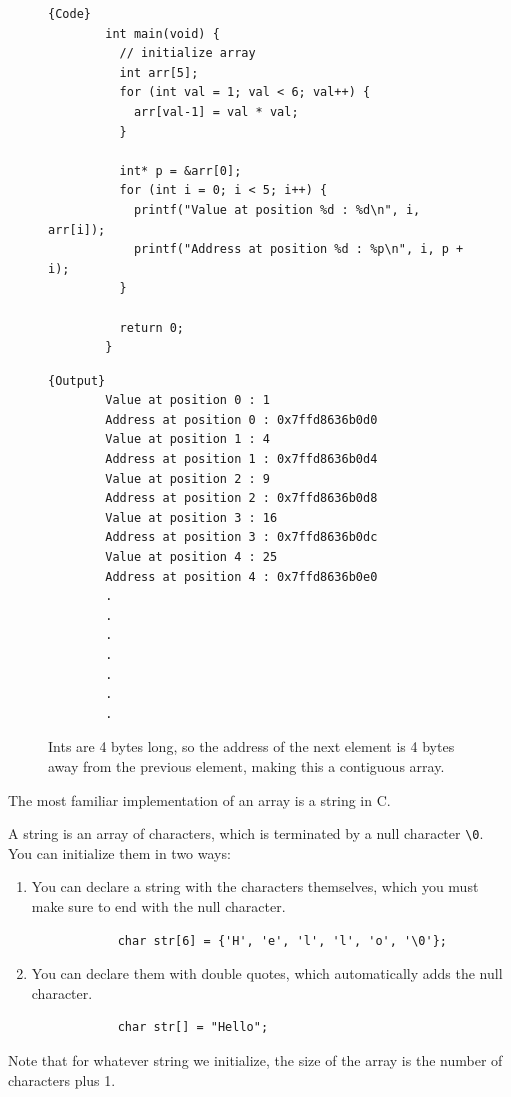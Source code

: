 \documentclass{article}
\newcounter{definition}[section]
\begin{document}
    \begin{figure}[H]
      \centering 
      \noindent\begin{minipage}{.5\textwidth}
      \begin{lstlisting}[]{Code}
        int main(void) {
          // initialize array 
          int arr[5]; 
          for (int val = 1; val < 6; val++) {
            arr[val-1] = val * val;
          }

          int* p = &arr[0]; 
          for (int i = 0; i < 5; i++) {
            printf("Value at position %d : %d\n", i, arr[i]); 
            printf("Address at position %d : %p\n", i, p + i); 
          }

          return 0; 
        }        
      \end{lstlisting}
      \end{minipage}
      \hfill
      \begin{minipage}{.49\textwidth}
      \begin{lstlisting}[]{Output}
        Value at position 0 : 1
        Address at position 0 : 0x7ffd8636b0d0
        Value at position 1 : 4
        Address at position 1 : 0x7ffd8636b0d4
        Value at position 2 : 9
        Address at position 2 : 0x7ffd8636b0d8
        Value at position 3 : 16
        Address at position 3 : 0x7ffd8636b0dc
        Value at position 4 : 25
        Address at position 4 : 0x7ffd8636b0e0
        .
        .
        .
        .
        .
        .
        .
      \end{lstlisting}
      \end{minipage}
      \caption{Ints are 4 bytes long, so the address of the next element is 4 bytes away from the previous element, making this a contiguous array.} 
      \label{fig:contiguous_array}
    \end{figure}

    The most familiar implementation of an array is a string in C. 

    \begin{definition}[String]
      \label{def:string}
      A string is an array of characters, which is terminated by a null character \texttt{\textbackslash 0}. You can initialize them in two ways: 
      \begin{enumerate}
        \item You can declare a string with the characters themselves, which you must make sure to end with the null character. 
          \begin{lstlisting} 
            char str[6] = {'H', 'e', 'l', 'l', 'o', '\0'}; 
          \end{lstlisting}
        \item You can declare them with double quotes, which automatically adds the null character. 
          \begin{lstlisting} 
            char str[] = "Hello"; 
          \end{lstlisting}
      \end{enumerate}
      Note that for whatever string we initialize, the size of the array is the number of characters plus 1. 
    \end{definition}
\end{document}
